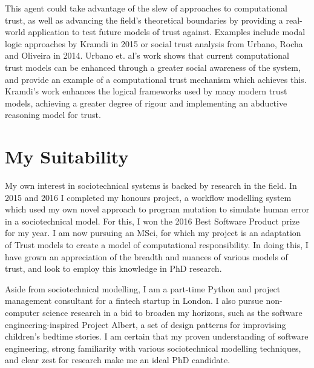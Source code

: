 \documentclass{tufte-handout}
\begin{document}
This agent could take advantage of the slew of approaches to computational trust, as well as advancing the field's theoretical boundaries by providing a real-world application to test future models of trust against. Examples include modal logic approaches by Kramdi in 2015\cite{Kramdi} or social trust analysis from Urbano, Rocha and Oliveira in 2014\cite{Urbano2014}. Urbano et. al's work shows that current computational trust models can be enhanced through a greater social awareness of the system, and provide an example of a computational trust mechanism which achieves this. Kramdi's work enhances the logical frameworks used by many modern trust models, achieving a greater degree of rigour and implementing an abductive reasoning model for trust.\par

\section{My Suitability}
My own interest in sociotechnical systems is backed by research in the field. In 2015 and 2016 I completed my honours project, a workflow modelling system which used my own novel approach to program mutation to simulate human error in a sociotechnical model. For this, I won the 2016 Best Software Product prize for my year. I am now pursuing an MSci, for which my project is an adaptation of Trust models to create a model of computational responsibility. In doing this, I have grown an appreciation of the breadth and nuances of various models of trust, and look to employ this knowledge in PhD research.\par

Aside from sociotechnical modelling, I am a part-time Python and project management consultant for a fintech startup in London. I also pursue non-computer science research in a bid to broaden my horizons, such as the software engineering-inspired Project Albert, a set of design patterns for improvising children's bedtime stories. I am certain that my proven understanding of software engineering, strong familiarity with various sociotechnical modelling techniques, and clear zest for research make me an ideal PhD candidate.


\end{document}
